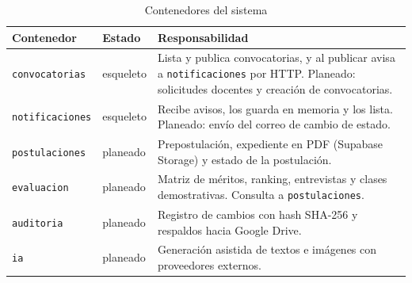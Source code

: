 \begin{table}[H]
\centering
\small
\caption{Contenedores del sistema}
\begin{tabularx}{\linewidth}{@{}p{3.1cm}p{2.7cm}X@{}}
\toprule
\textbf{Contenedor} & \textbf{Estado} & \textbf{Responsabilidad} \\
\midrule
\texttt{convocatorias} & esqueleto & Lista y publica convocatorias, y al publicar avisa a \texttt{notificaciones} por HTTP. Planeado: solicitudes docentes y creación de convocatorias. \\
\texttt{notificaciones} & esqueleto & Recibe avisos, los guarda en memoria y los lista. Planeado: envío del correo de cambio de estado. \\
\texttt{postulaciones} & planeado & Prepostulación, expediente en PDF (Supabase Storage) y estado de la postulación. \\
\texttt{evaluacion} & planeado & Matriz de méritos, ranking, entrevistas y clases demostrativas. Consulta a \texttt{postulaciones}. \\
\texttt{auditoria} & planeado & Registro de cambios con hash SHA-256 y respaldos hacia Google Drive. \\
\texttt{ia} & planeado & Generación asistida de textos e imágenes con proveedores externos. \\
\bottomrule
\end{tabularx}
\end{table}
